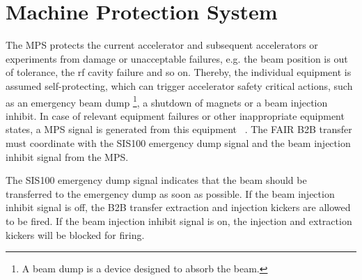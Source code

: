 \section{Machine Protection System}
The \gls{MPS} protects the current accelerator and subsequent accelerators or experiments from damage or unacceptable failures, e.g. the beam position is out of tolerance, the rf cavity failure and so on. Thereby, the individual equipment is assumed self-protecting, which can trigger accelerator safety critical actions, such as an emergency beam dump \footnote{A beam dump is a device designed to absorb the beam.}, a shutdown of magnets or a beam injection inhibit. In case of relevant equipment failures or other inappropriate equipment states, a MPS signal is generated from this equipment ~\cite{mandakovic_f-tc-c-02e_2015}. The FAIR B2B transfer must coordinate with the SIS100 emergency dump signal and the beam injection inhibit signal from the MPS. 

The SIS100 emergency dump signal indicates that the beam should be transferred to the emergency dump as soon as possible. If the beam injection inhibit signal is off, the B2B transfer extraction and injection kickers are allowed to be fired. If the beam injection inhibit signal is on, the injection and extraction kickers will be blocked for firing. 






